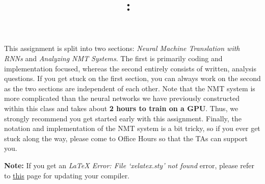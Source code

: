 \documentclass[answers]{exam}
\title{
\vspace{-1in}
\textmd{\textbf{\hmwkClass:\ \hmwkTitle} \\ \hmwkAuthorName}
}
\author{}
\date{}
\begin{document}
\maketitle
\vspace{-.5in}


This assignment is split into two sections: \textit{Neural Machine Translation with RNNs} and \textit{Analyzing NMT Systems}. The first is primarily coding and implementation focused, whereas the second entirely consists of written, analysis questions. If you get stuck on the first section, you can always work on the second as the two sections are independent of each other. Note that the NMT system is more complicated than the neural networks we have previously constructed within this class and takes about \textbf{2 hours to train on a GPU}. Thus, we strongly recommend you get started early with this assignment. Finally, the notation and implementation of the NMT system is a bit tricky, so if you ever get stuck along the way, please come to Office Hours so that the TAs can support you. \newline

\textbf{Note:} If you get an \textit{LaTeX Error: File `xelatex.sty' not found} error, please refer to \href{https://www.overleaf.com/learn/how-to/Changing_compiler}{this} page for updating your compiler. \newline

\begin{questions}
    
    
\end{questions}


\end{document}
